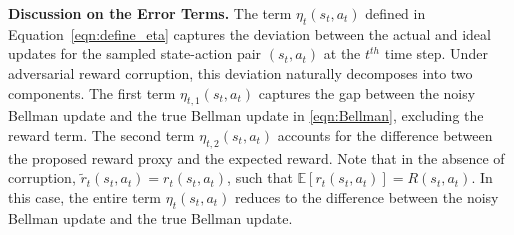 \documentclass{article}
\begin{document}
\textbf{Discussion on the Error Terms.} The term $\eta_t(s_t, a_t)$ defined in Equation~\eqref{eqn:define_eta} captures the deviation between the actual and ideal updates for the sampled state-action pair \((s_t,a_t)\) at the \(t^{th}\) time step. Under adversarial reward corruption, this deviation naturally decomposes into two components. The first term $\eta_{t,1}(s_t,a_t)$  captures the gap between the noisy Bellman update and the true Bellman update in \eqref{eqn:Bellman}, excluding the reward term. The second term $\eta_{t,2}(s_t,a_t)$ accounts for the difference between the proposed reward proxy and the expected reward. Note that in the absence of corruption, \(\tilde{r}_t(s_t,a_t) = r_t(s_t,a_t)\), such that \(\mathbb{E}[r_t(s_t,a_t)] = R(s_t,a_t)\). In this case, the entire term $\eta_t(s_t, a_t)$ reduces to the difference between the noisy Bellman update and the true Bellman update. 
\end{document}
